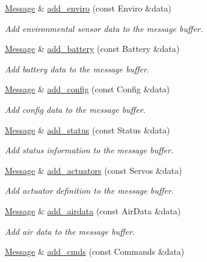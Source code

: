 \begin{DoxyCompactItemize}
\hyperlink{classaero_1_1Message}{Message} \& \hyperlink{classaero_1_1Message_a23084d7acb0f27c23c8fc6a7e156a0b9}{add\+\_\+enviro} (const Enviro \&data)
\begin{DoxyCompactList}\small\item\em Add environmental sensor data to the message buffer. \end{DoxyCompactList}\item 
\hyperlink{classaero_1_1Message}{Message} \& \hyperlink{classaero_1_1Message_aac514c46af35b6ddfda4f2f8b1d4a259}{add\+\_\+battery} (const Battery \&data)
\begin{DoxyCompactList}\small\item\em Add battery data to the message buffer. \end{DoxyCompactList}\item 
\hyperlink{classaero_1_1Message}{Message} \& \hyperlink{classaero_1_1Message_a23461ffe32d102334c42532445ccb3c7}{add\+\_\+config} (const Config \&data)
\begin{DoxyCompactList}\small\item\em Add config data to the message buffer. \end{DoxyCompactList}\item 
\hyperlink{classaero_1_1Message}{Message} \& \hyperlink{classaero_1_1Message_ab113bd985f8470f2efcb02bf08d3227d}{add\+\_\+status} (const Status \&data)
\begin{DoxyCompactList}\small\item\em Add status information to the message buffer. \end{DoxyCompactList}\item 
\hyperlink{classaero_1_1Message}{Message} \& \hyperlink{classaero_1_1Message_a2788663a53895a6e6f5813f1da64d57d}{add\+\_\+actuators} (const Servos \&data)
\begin{DoxyCompactList}\small\item\em Add actuator definition to the message buffer. \end{DoxyCompactList}\item 
\hyperlink{classaero_1_1Message}{Message} \& \hyperlink{classaero_1_1Message_a67c34e4f8bf44765914dae130b292ab7}{add\+\_\+airdata} (const Air\+Data \&data)
\begin{DoxyCompactList}\small\item\em Add air data to the message buffer. \end{DoxyCompactList}\item 
\hyperlink{classaero_1_1Message}{Message} \& \hyperlink{classaero_1_1Message_ab50e7e98a37bdf7b803ec9fba9b6c787}{add\+\_\+cmds} (const Commands \&data)

\end{DoxyCompactItemize}
